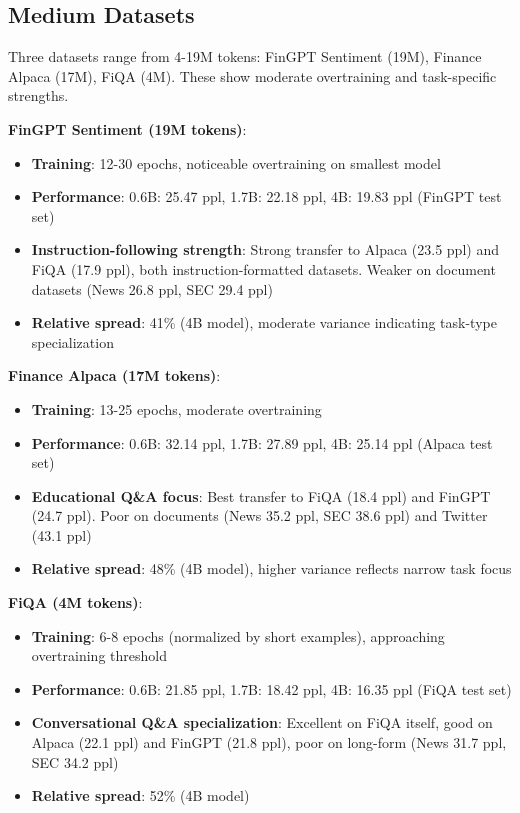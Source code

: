 



\subsection{Medium Datasets}

Three datasets range from 4-19M tokens: FinGPT Sentiment (19M), Finance Alpaca (17M), FiQA (4M). These show moderate overtraining and task-specific strengths.

\textbf{FinGPT Sentiment (19M tokens)}:
\begin{itemize}
\item \textbf{Training}: 12-30 epochs, noticeable overtraining on smallest model
\item \textbf{Performance}: 0.6B: 25.47 ppl, 1.7B: 22.18 ppl, 4B: 19.83 ppl (FinGPT test set)
\item \textbf{Instruction-following strength}: Strong transfer to Alpaca (23.5 ppl) and FiQA (17.9 ppl), both instruction-formatted datasets. Weaker on document datasets (News 26.8 ppl, SEC 29.4 ppl)
\item \textbf{Relative spread}: 41\% (4B model), moderate variance indicating task-type specialization
\end{itemize}

\textbf{Finance Alpaca (17M tokens)}:
\begin{itemize}
\item \textbf{Training}: 13-25 epochs, moderate overtraining
\item \textbf{Performance}: 0.6B: 32.14 ppl, 1.7B: 27.89 ppl, 4B: 25.14 ppl (Alpaca test set)
\item \textbf{Educational Q\&A focus}: Best transfer to FiQA (18.4 ppl) and FinGPT (24.7 ppl). Poor on documents (News 35.2 ppl, SEC 38.6 ppl) and Twitter (43.1 ppl)
\item \textbf{Relative spread}: 48\% (4B model), higher variance reflects narrow task focus
\end{itemize}

\textbf{FiQA (4M tokens)}:
\begin{itemize}
\item \textbf{Training}: 6-8 epochs (normalized by short examples), approaching overtraining threshold
\item \textbf{Performance}: 0.6B: 21.85 ppl, 1.7B: 18.42 ppl, 4B: 16.35 ppl (FiQA test set)
\item \textbf{Conversational Q\&A specialization}: Excellent on FiQA itself, good on Alpaca (22.1 ppl) and FinGPT (21.8 ppl), poor on long-form (News 31.7 ppl, SEC 34.2 ppl)
\item \textbf{Relative spread}: 52\% (4B model)
\end{itemize}

